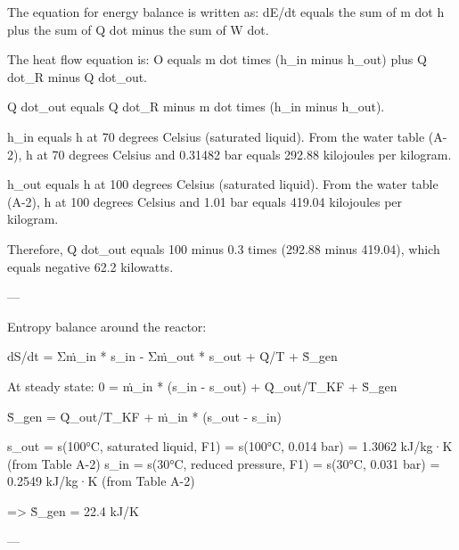 The equation for energy balance is written as:  
dE/dt equals the sum of m dot h plus the sum of Q dot minus the sum of W dot.  

The heat flow equation is:  
O equals m dot times (h_in minus h_out) plus Q dot_R minus Q dot_out.  

Q dot_out equals Q dot_R minus m dot times (h_in minus h_out).  

h_in equals h at 70 degrees Celsius (saturated liquid). From the water table (A-2), h at 70 degrees Celsius and 0.31482 bar equals 292.88 kilojoules per kilogram.  

h_out equals h at 100 degrees Celsius (saturated liquid). From the water table (A-2), h at 100 degrees Celsius and 1.01 bar equals 419.04 kilojoules per kilogram.  

Therefore, Q dot_out equals 100 minus 0.3 times (292.88 minus 419.04), which equals negative 62.2 kilowatts.  

---

Entropy balance around the reactor:  

dS/dt = Σṁ_in * s_in - Σṁ_out * s_out + Q̇/T + Ṡ_gen  

At steady state:  
0 = ṁ_in * (s_in - s_out) + Q̇_out/T_KF + Ṡ_gen  

Ṡ_gen = Q̇_out/T_KF + ṁ_in * (s_out - s_in)  

s_out = s(100°C, saturated liquid, F1) = s(100°C, 0.014 bar) = 1.3062 kJ/kg·K (from Table A-2)  
s_in = s(30°C, reduced pressure, F1) = s(30°C, 0.031 bar) = 0.2549 kJ/kg·K (from Table A-2)  

=> Ṡ_gen = 22.4 kJ/K  

---